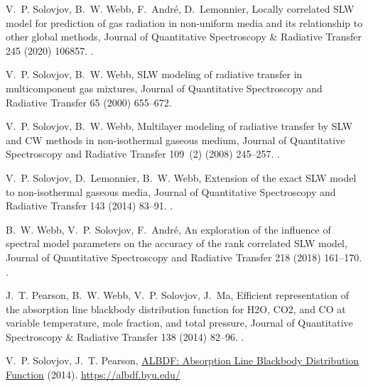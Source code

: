 \documentclass[preprint,12pt]{elsarticle}
\newcounter{bla}
\begin{document}
\begin{thebibliography}{10}
V.~P. Solovjov, B.~W. Webb, F.~Andr{\'e}, D.~Lemonnier, {Locally correlated
  {SLW} model for prediction of gas radiation in non-uniform media and its
  relationship to other global methods}, {Journal of Quantitative Spectroscopy
  {\&} Radiative Transfer} 245 (2020) 106857.
\newblock \href {http://dx.doi.org/10.1016/j.jqsrt.2020.106857}
  {}.

V.~P. Solovjov, B.~W. Webb, {{SLW} modeling of radiative transfer in
  multicomponent gas mixtures}, {Journal of Quantitative Spectroscopy and
  Radiative Transfer} 65 (2000) 655--672.

V.~P. Solovjov, B.~W. Webb, {Multilayer modeling of radiative transfer by {SLW}
  and {CW} methods in non-isothermal gaseous medium}, {Journal of Quantitative
  Spectroscopy and Radiative Transfer} 109~(2) (2008) 245--257.
\newblock \href {http://dx.doi.org/10.1016/j.jqsrt.2007.08.015}
  {}.

V.~P. Solovjov, D.~Lemonnier, B.~W. Webb, {Extension of the exact {SLW} model
  to non-isothermal gaseous media}, {Journal of Quantitative Spectroscopy and
  Radiative Transfer} 143 (2014) 83--91.
\newblock \href {http://dx.doi.org/10.1016/j.jqsrt.2013.10.008}
  {}.

B.~W. Webb, V.~P. Solovjov, F.~Andr{\'e}, {An exploration of the influence of
  spectral model parameters on the accuracy of the rank correlated SLW model},
  {Journal of Quantitative Spectroscopy and Radiative Transfer} 218 (2018)
  161--170.
\newblock \href {http://dx.doi.org/10.1016/j.jqsrt.2018.06.023}
  {}.

J.~T. Pearson, B.~W. Webb, V.~P. Solovjov, J.~Ma, {Efficient representation of
  the absorption line blackbody distribution function for H2O, CO2, and CO at
  variable temperature, mole fraction, and total pressure}, {Journal of
  Quantitative Spectroscopy {\&} Radiative Transfer} 138 (2014) 82--96.
\newblock \href {http://dx.doi.org/10.1016/j.jqsrt.2014.01.019}
  {}.

V.~P. Solovjov, J.~T. Pearson, \href{https://albdf.byu.edu/}{{ALBDF: Absorption
  Line Blackbody Distribution Function}} (2014).
\newline\urlprefix\url{https://albdf.byu.edu/}


\end{thebibliography}
\end{document}
